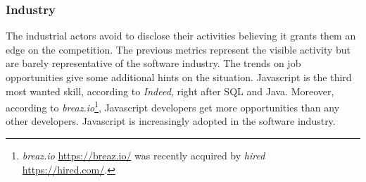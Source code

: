 \begin{figure}
\end{figure}

\begin{figure}
\end{figure}

\begin{figure}
\end{figure}

\subsubsection{Industry}

The industrial actors avoid to disclose their activities believing it grants them an edge on the competition.
The previous metrics represent the visible activity but are barely representative of the software industry.
The trends on job opportunities give some additional hints on the situation.
Javascript is the third most wanted skill, according to \textit{Indeed}, right after SQL and Java.
Moreover, according to \textit{breaz.io}\footnote{\textit{breaz.io} \url{https://breaz.io/} was recently acquired by \textit{hired} \url{https://hired.com/}.}, Javascript developers get more opportunities than any other developers.
Javascript is increasingly adopted in the software industry.

